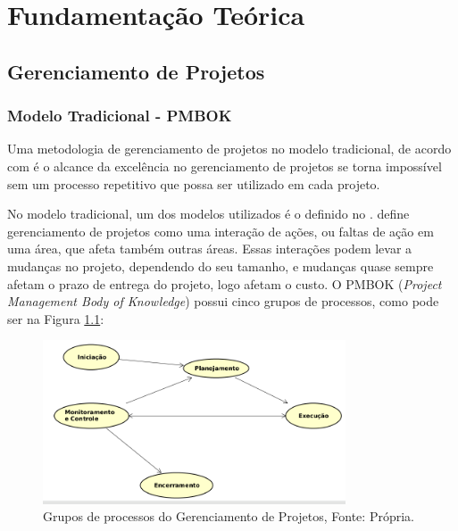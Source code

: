 \chapter[Fundamentação Teórica]{Fundamentação Teórica}
\label{cp:fundamentacao}

\section{Gerenciamento de Projetos}
\label{sec:gerenciamento_de_projetos}

\subsection{Modelo Tradicional - PMBOK}
\label{sec:modelo_tradicional}

Uma metodologia de gerenciamento de projetos no modelo tradicional, de acordo com  é o alcance da excelência no gerenciamento de projetos se torna impossível sem um processo repetitivo que possa ser utilizado em cada projeto.

No modelo tradicional, um dos modelos utilizados é o definido no .  define gerenciamento de projetos como uma interação de ações, ou faltas de ação em uma área, que afeta também outras áreas. Essas interações podem levar a mudanças no projeto, dependendo do seu tamanho, e mudanças quase sempre afetam o prazo de entrega do projeto, logo afetam o custo. O PMBOK (\textit{Project Management Body of Knowledge}) possui cinco grupos de processos, como pode ser na Figura \ref{img:fases_pmbok}:

\begin{figure}[H]
	\centering
	\includegraphics[width=0.8\textwidth]{figuras/fases_pmbok.png}
	\caption{Grupos de processos do Gerenciamento de Projetos, Fonte: Própria.}
	\label{img:fases_pmbok}
\end{figure}

